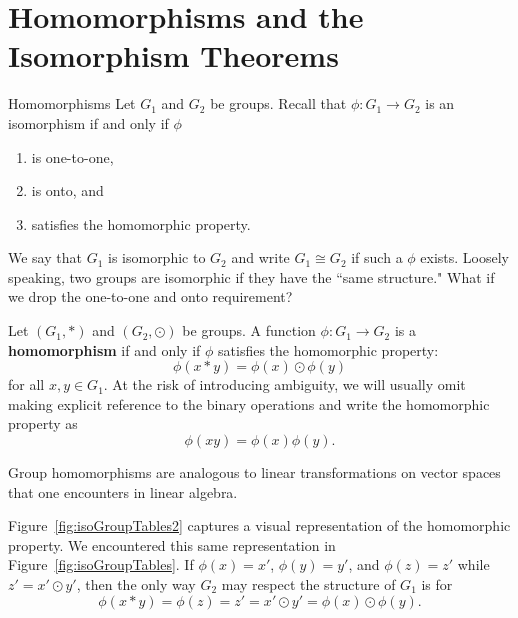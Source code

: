 \chapter{Homomorphisms and the Isomorphism Theorems}
\label{chapter:homomorphisms}

\begin{section}{Homomorphisms}
Let $G_1$ and $G_2$ be groups. Recall that $\phi:G_1\to G_2$ is an isomorphism if and only if $\phi$
\begin{enumerate}[label=\textrm{(\alph*)}]
\item is one-to-one, 
\item is onto, and
\item satisfies the homomorphic property.
\end{enumerate}
We say that $G_1$ is isomorphic to $G_2$ and write $G_1\cong G_2$ if such a $\phi$ exists. Loosely speaking, two groups are isomorphic if they have the ``same structure."  What if we drop the one-to-one and onto requirement?

\begin{definition}
Let $(G_1,*)$ and $(G_2,\odot)$ be groups. A function $\phi:G_1\to G_2$ is a \textbf{homomorphism} if and only if $\phi$ satisfies the homomorphic property:
\[
\phi(x*y)=\phi(x)\odot\phi(y)
\]
for all $x,y\in G_1$. At the risk of introducing ambiguity, we will usually omit making explicit reference to the binary operations and write the homomorphic property as
\[
\phi(xy)=\phi(x)\phi(y).
\]
\end{definition}

Group homomorphisms are analogous to linear transformations on vector spaces that one encounters in linear algebra.

Figure~\ref{fig:isoGroupTables2} captures a visual representation of the homomorphic property.  We encountered this same representation in Figure~\ref{fig:isoGroupTables}. If $\phi(x)=x'$, $\phi(y)=y'$, and $\phi(z)=z'$ while $z'=x'\odot y'$, then the only way $G_2$ may respect the structure of $G_1$ is for
\[
\phi(x*y)=\phi(z)=z'=x'\odot y'=\phi(x)\odot \phi(y).
\]


\end{section}
